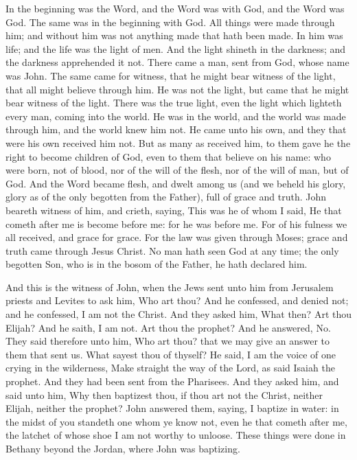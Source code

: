 


In the beginning was the Word, and the Word was with God, and the Word was God. The same was in the beginning with God. All things were made through him; and without him was not anything made that hath been made. In him was life; and the life was the light of men. And the light shineth in the darkness; and the darkness apprehended it not. There came a man, sent from God, whose name was John. The same came for witness, that he might bear witness of the light, that all might believe through him. He was not the light, but came that he might bear witness of the light. There was the true light, even the light which lighteth every man, coming into the world. He was in the world, and the world was made through him, and the world knew him not. He came unto his own, and they that were his own received him not. But as many as received him, to them gave he the right to become children of God, even to them that believe on his name: who were born, not of blood, nor of the will of the flesh, nor of the will of man, but of God. And the Word became flesh, and dwelt among us (and we beheld his glory, glory as of the only begotten from the Father), full of grace and truth. John beareth witness of him, and crieth, saying, This was he of whom I said, He that cometh after me is become before me: for he was before me. For of his fulness we all received, and grace for grace. For the law was given through Moses; grace and truth came through Jesus Christ. No man hath seen God at any time; the only begotten Son, who is in the bosom of the Father, he hath declared him.  

And this is the witness of John, when the Jews sent unto him from Jerusalem priests and Levites to ask him, Who art thou? And he confessed, and denied not; and he confessed, I am not the Christ. And they asked him, What then? Art thou Elijah? And he saith, I am not. Art thou the prophet? And he answered, No. They said therefore unto him, Who art thou? that we may give an answer to them that sent us. What sayest thou of thyself? He said, I am the voice of one crying in the wilderness, Make straight the way of the Lord, as said Isaiah the prophet. And they had been sent from the Pharisees. And they asked him, and said unto him, Why then baptizest thou, if thou art not the Christ, neither Elijah, neither the prophet? John answered them, saying, I baptize in water: in the midst of you standeth one whom ye know not, even he that cometh after me, the latchet of whose shoe I am not worthy to unloose. These things were done in Bethany beyond the Jordan, where John was baptizing.  

